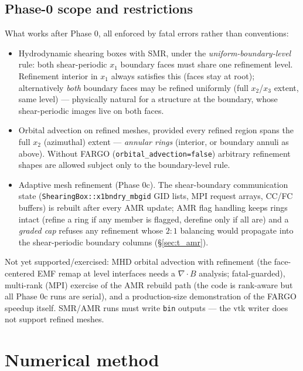 \documentclass[11pt]{article}
\newcommand{\code}[1]{\texttt{#1}}
\begin{document}
\subsection{Phase-0 scope and restrictions}
What works after Phase 0, all enforced by fatal errors rather than conventions:
\begin{itemize}
  \item Hydrodynamic shearing boxes with SMR, under the \emph{uniform-boundary-level}
        rule: both shear-periodic $x_1$ boundary faces must share one refinement
        level. Refinement interior in $x_1$ always satisfies this (faces stay at
        root); alternatively \emph{both} boundary faces may be refined uniformly
        (full $x_2$/$x_3$ extent, same level) --- physically natural for a structure
        at the boundary, whose shear-periodic images live on both faces.
  \item Orbital advection on refined meshes, provided every refined region spans the
        full $x_2$ (azimuthal) extent --- \emph{annular rings} (interior, or boundary
        annuli as above). Without FARGO (\code{orbital\_advection=false}) arbitrary
        refinement shapes are allowed subject only to the boundary-level rule.
  \item Adaptive mesh refinement (Phase 0c). The shear-boundary communication state
        (\code{ShearingBox::x1bndry\_mbgid} GID lists, MPI request arrays, CC/FC
        buffers) is rebuilt after every AMR update; AMR flag handling keeps rings
        intact (refine a ring if any member is flagged, derefine only if all are)
        and a \emph{graded cap} refuses any refinement whose $2{:}1$ balancing
        would propagate into the shear-periodic boundary columns
        (\S\ref{sec:t_amr}).
\end{itemize}
Not yet supported/exercised: MHD orbital advection
with refinement (the face-centered EMF remap at level interfaces needs a
$\nabla\!\cdot\!B$ analysis; fatal-guarded), multi-rank (MPI) exercise of the AMR
rebuild path (the code is rank-aware but all Phase 0c runs are serial), and a
production-size demonstration of
the FARGO speedup itself. SMR/AMR runs must write \code{bin} outputs --- the vtk
writer does not support refined meshes.

\section{Numerical method}
\label{sec:method}
\end{document}
